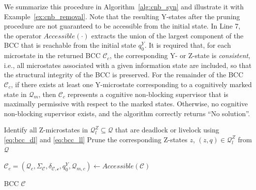 \documentclass[journal,twoside,web]{ieeecolor}
\begin{document}
We summarize this procedure in Algorithm~\ref{alg:cnb_syn} and illustrate it with Example~\ref{ex:cnb_removal}.
%
Note that the resulting Y-states after the pruning procedure are not guaranteed to be accessible from the initial state. 
In Line 7, the operator $Accessible(\cdot)$ extracts the union of the largest component of the BCC that is reachable from the initial state $q^Y_0$. 
It is required that, for each microstate in the returned BCC $\mathcal{C}_c$, the corresponding Y- or Z-state is \emph{consistent}, i.e., all microstates associated with a given information state are included, so that the structural integrity of the BCC is preserved.  
%
For the remainder of the BCC $\mathcal{C}_c$, if there exists at least one Y-microstate corresponding to a cognitively marked state in $\bm{\mathcal{Q}}_{m}$, then $\mathcal{C}_c$ represents a cognitive non-blocking supervisor that is maximally permissive with respect to the marked states.  
Otherwise, no cognitive non-blocking supervisor exists, and the algorithm correctly returns ``No solution''.


\begin{algorithm}[t!]
\caption{Synthesis of Cognitive Non-Blocking BCC}
\label{alg:cnb_syn}

\BlankLine

Identify all Z-microstates in $\bm{\mathcal{Q}}^Z_l \subseteq \bm{\mathcal{Q}}$ that are deadlock or livelock using \eqref{eq:bcc_dl} and \eqref{eq:bcc_ll}\;
Prune the corresponding Z-states $z$, $(z, q) \in \bm{\mathcal{Q}}^Z_l$ from $\bm{\mathcal{Q}}$\;

$\mathcal{C}_c = (\bm{\mathcal{Q}}_c, \Sigma_\mathcal{C}, \delta_\mathcal{C, c}, q^Y_0, \bm{\mathcal{Q}}_{m,c}) \gets Accessible(\mathcal{C})$\;


\Return BCC $\mathcal{C}$\;
\end{algorithm}
\end{document}
